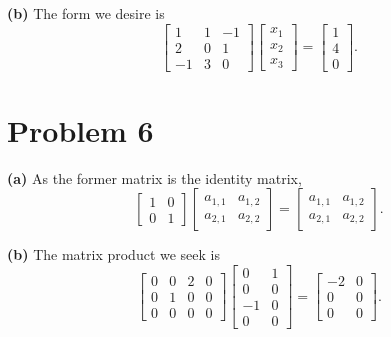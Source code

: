 \documentclass[11pt]{article}
\begin{document}
\textbf{(b)} The form we desire is 
\[
	\begin{bmatrix} 1 & 1 & -1 \\ 2 & 0 & 1 \\ -1 & 3 & 0 \end{bmatrix} \begin{bmatrix} x_{1} \\ x_{2} \\ x_{3} \end{bmatrix} = \begin{bmatrix} 1 \\ 4 \\ 0 \end{bmatrix}.
\]

\section{Problem 6}

\textbf{(a)} As the former matrix is the identity matrix,
\[
\begin{bmatrix} 1 & 0 \\ 0 & 1 \end{bmatrix} \begin{bmatrix} a_{1, 1} & a_{1, 2} \\ a_{2, 1} & a_{2, 2} \end{bmatrix} = \begin{bmatrix} a_{1, 1} & a_{1, 2} \\ a_{2, 1} & a_{2, 2} \end{bmatrix}.
\]

\textbf{(b)} The matrix product we seek is
\[
	\begin{bmatrix}
		0 & 0 & 2 & 0 \\ 0 & 1 & 0 & 0 \\ 0 & 0 & 0 & 0 \end{bmatrix} \begin{bmatrix} 0 & 1 \\ 0 & 0 \\ -1 & 0 \\ 0 & 0  \end{bmatrix} = \begin{bmatrix} -2 & 0 \\ 0 & 0 \\ 0 & 0 \end{bmatrix}.
\]
\end{document}
